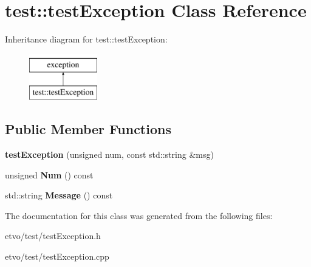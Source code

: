 \hypertarget{classtest_1_1test_exception}{}\section{test\+:\+:test\+Exception Class Reference}
\label{classtest_1_1test_exception}
Inheritance diagram for test\+:\+:test\+Exception\+:\begin{figure}[H]
\begin{center}
\leavevmode
\includegraphics[height=2.000000cm]{classtest_1_1test_exception}
\end{center}
\end{figure}
\subsection*{Public Member Functions}
\begin{DoxyCompactItemize}
\item 
\mbox{\label{classtest_1_1test_exception_aef9108e6feece2c8476c1c3d09b0f0ed}} 
{\bfseries test\+Exception} (unsigned num, const std\+::string \&msg)
\item 
\mbox{\label{classtest_1_1test_exception_a1c64f3bd64d3d6bbb461ae2e333e6555}} 
unsigned {\bfseries Num} () const
\item 
\mbox{\label{classtest_1_1test_exception_ad58ece655ba80e4a9d2c20637afb3039}} 
std\+::string {\bfseries Message} () const
\end{DoxyCompactItemize}


The documentation for this class was generated from the following files\+:\begin{DoxyCompactItemize}
\item 
etvo/test/test\+Exception.\+h\item 
etvo/test/test\+Exception.\+cpp\end{DoxyCompactItemize}
